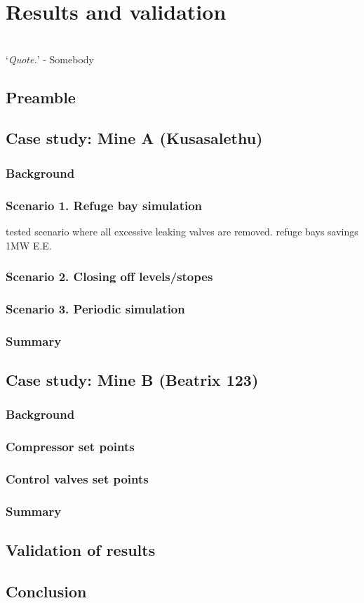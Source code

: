 \chapter{Results and validation}
\thispagestyle{empty}
\vspace{38em}
\hrulefill
\\
\enquote*{\textit{Quote.}} - Somebody\\
\newpage
\section{Preamble}
\section{Case study: Mine A \color{blue}(Kusasalethu)}
	\subsection{Background}
	\subsection{Scenario 1. Refuge bay simulation}
	tested scenario where all excessive leaking valves are removed.
	refuge bays savings 1MW E.E.
	\subsection{Scenario 2. Closing off levels/stopes}
	
	\subsection{Scenario 3. Periodic simulation}
	\subsection{Summary}
\section{Case study: Mine B \color{blue}(Beatrix 123)}
	\subsection{Background}
	\subsection{Compressor set points}
	\subsection{Control valves set points}
	\subsection{Summary}
\section{Validation of results}
\section{Conclusion}